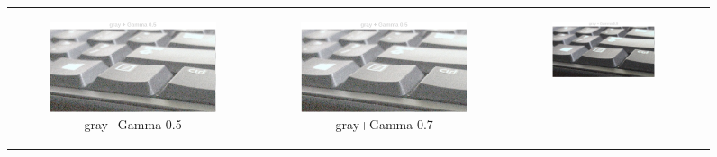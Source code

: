 \documentclass[11pt, a4]{article}
\begin{document}
\begin{enumerate}
\begin{enumerate}
\begin{figure}[h]
{\begin{tabular}{cccc}
\begin{subfigure}[h]{0.45\linewidth}
							\includegraphics[width=\linewidth]{../output/RawImage2_Tone_gray_Gamma0.5.pdf}
							\caption{gray+Gamma 0.5}
							\label{fig:RawImage2_tone_2}
						\end{subfigure} &
						\begin{subfigure}[h]{0.45\linewidth}
							\centering
							\includegraphics[width=\linewidth]{../output/RawImage2_Tone_gray_Gamma0.5.pdf}
							\caption{gray+Gamma 0.7}
							\label{fig:RawImage2_tone_3}
						\end{subfigure} &
						\begin{subfigure}[h]{0.45\linewidth}
							\centering
							\includegraphics[width=\linewidth]{../output/RawImage2_Tone_gray_Gamma0.9.pdf}

\end{subfigure}
\end{tabular}}
\end{figure}
\end{enumerate}
\end{enumerate}
\end{document}
